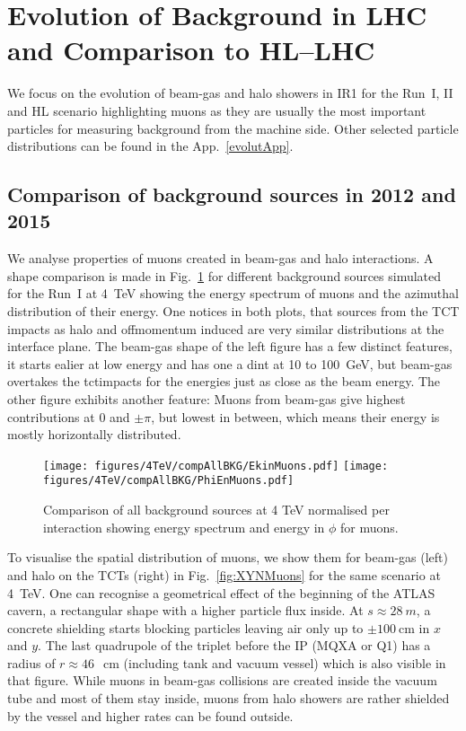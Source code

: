 \newpage
\section{Evolution of Background in LHC and Comparison to HL--LHC\label{evolut}}

We focus on the evolution of beam-gas and halo showers in IR1 for the Run~I, II and HL scenario highlighting muons as they are usually the most important particles for measuring background from the machine side. Other selected particle distributions can be found in the App.~\ref{evolutApp}.

\subsection{Comparison of background sources in 2012 and 2015}


We analyse properties of muons created in beam-gas and halo interactions. A shape comparison is made in Fig.~\ref{fig:compAllBKG_muons} for different background sources simulated for the Run~I at 4~TeV showing the energy spectrum of muons and the azimuthal distribution of their energy. One notices in both plots, that sources from the TCT impacts as halo and offmomentum induced are very similar distributions at the interface plane. The beam-gas shape of the left figure has a few distinct features, it starts ealier at low energy and has one a dint at 10 to 100~GeV, but beam-gas overtakes the tctimpacts for the energies just as close as the beam energy. The other figure exhibits another feature: Muons from beam-gas give highest contributions at $0$ and $\pm \pi$, but lowest in between, which means their energy is mostly horizontally distributed.\\

\begin{figure}%
\begin{center}
  \texttt{[image: figures/4TeV/compAllBKG/EkinMuons.pdf]}
  \texttt{[image: figures/4TeV/compAllBKG/PhiEnMuons.pdf]}
\end{center}
\vspace{-0.6cm}
 \caption{Comparison of all background sources at 4 TeV normalised per interaction showing energy spectrum and energy in $\phi$ for muons.
  \label{fig:compAllBKG_muons}}
\end{figure}
To visualise the spatial distribution of muons, we show them for beam-gas (left) and halo on the TCTs (right) in Fig.~\ref{fig:XYNMuons} for the same scenario at 4~TeV. One can recognise a geometrical effect of the beginning of the ATLAS cavern, a rectangular shape with a higher particle flux inside. At $s \approx 28~m$, a concrete shielding starts blocking particles leaving air only up to $\pm 100~$cm in $x$ and $y$. The last quadrupole of the triplet before the IP (MQXA or Q1) has a radius of $r \approx 46~$~cm (including tank and vacuum vessel) which is also visible in that figure. While muons in beam-gas collisions are created inside the vacuum tube and most of them stay inside, muons from halo showers are rather shielded by the vessel and higher rates can be found outside.


